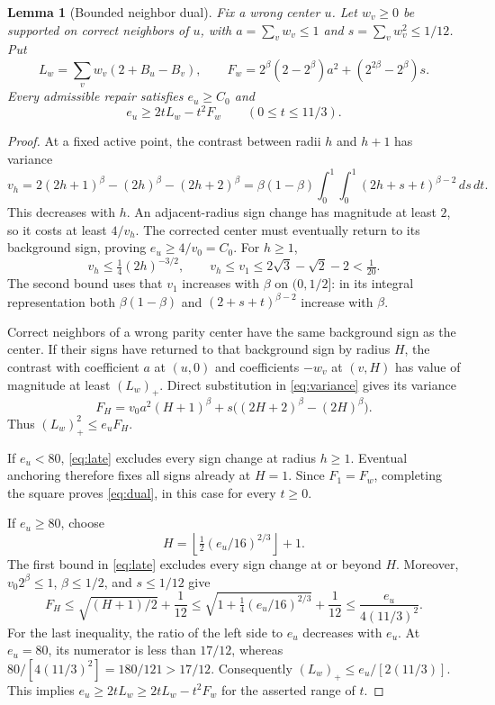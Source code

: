\documentclass[11pt]{article}
\newtheorem{lemma}[theorem]{Lemma}
\newcommand{\1}{\mathbf 1}
\begin{document}
\begin{lemma}[Bounded neighbor dual]\label{lem:dual}
Fix a wrong center $u$. Let $w_v\ge0$ be supported on correct neighbors
of $u$, with $a=\sum_vw_v\le1$ and $s=\sum_vw_v^2\le1/12$. Put
\[
 L_w=\sum_vw_v(2+B_u-B_v),\qquad
 F_w=2^\beta(2-2^\beta)a^2+(2^{2\beta}-2^\beta)s.
\]
Every admissible repair satisfies $e_u\ge C_0$ and
\begin{equation}\label{eq:dual}
 e_u\ge2tL_w-t^2F_w\qquad(0\le t\le11/3).
\end{equation}
\end{lemma}
\begin{proof}
At a fixed active point, the contrast between radii $h$ and $h+1$ has
variance
\[
 v_h=2(2h+1)^\beta-(2h)^\beta-(2h+2)^\beta
 =\beta(1-\beta)\int_0^1\!\int_0^1
                 (2h+s+t)^{\beta-2}\,ds\,dt.
\]
This decreases with $h$. An adjacent-radius sign change has magnitude
at least $2$, so it costs at least $4/v_h$. The corrected center must
eventually return to its background sign, proving $e_u\ge4/v_0=C_0$.
For $h\ge1$,
\begin{equation}\label{eq:late}
 v_h\le\tfrac14(2h)^{-3/2},\qquad
 v_h\le v_1\le2\sqrt3-\sqrt2-2<\tfrac1{20}.
\end{equation}
The second bound uses that $v_1$ increases with $\beta$ on $(0,1/2]$: in
its integral representation both $\beta(1-\beta)$ and $(2+s+t)^{\beta-2}$
increase with $\beta$.

Correct neighbors of a wrong parity center have the same background
sign as the center. If their signs have returned to that background
sign by radius $H$, the contrast with coefficient $a$ at $(u,0)$ and
coefficients $-w_v$ at $(v,H)$ has value of magnitude at least
$(L_w)_+$. Direct substitution in \eqref{eq:variance} gives its variance
\begin{equation}\label{eq:FH}
 F_H=v_0a^2(H+1)^\beta+s\bigl((2H+2)^\beta-(2H)^\beta\bigr).
\end{equation}
Thus $(L_w)_+^2\le e_uF_H$.

If $e_u<80$, \eqref{eq:late} excludes every sign change at radius
$h\ge1$. Eventual anchoring therefore fixes all signs already at
$H=1$. Since $F_1=F_w$, completing the square proves
\eqref{eq:dual}, in this case for every $t\ge0$.

If $e_u\ge80$, choose
\[
 H=\left\lfloor\tfrac12(e_u/16)^{2/3}\right\rfloor+1.
\]
The first bound in \eqref{eq:late} excludes every sign change at or
beyond $H$. Moreover, $v_0 2^\beta\le1$, $\beta\le1/2$, and
$s\le1/12$ give
\[
 F_H\le\sqrt{(H+1)/2}+\frac1{12}
 \le\sqrt{1+\tfrac14(e_u/16)^{2/3}}+\frac1{12}
 \le\frac{e_u}{4(11/3)^2}.
\]
For the last inequality, the ratio of the left side to $e_u$ decreases
with $e_u$. At $e_u=80$, its numerator is less than $17/12$, whereas
$80/[4(11/3)^2]=180/121>17/12$.
Consequently $(L_w)_+\le e_u/[2(11/3)]$. This implies
$e_u\ge2tL_w\ge2tL_w-t^2F_w$ for the asserted range of $t$.
\end{proof}
\end{document}
